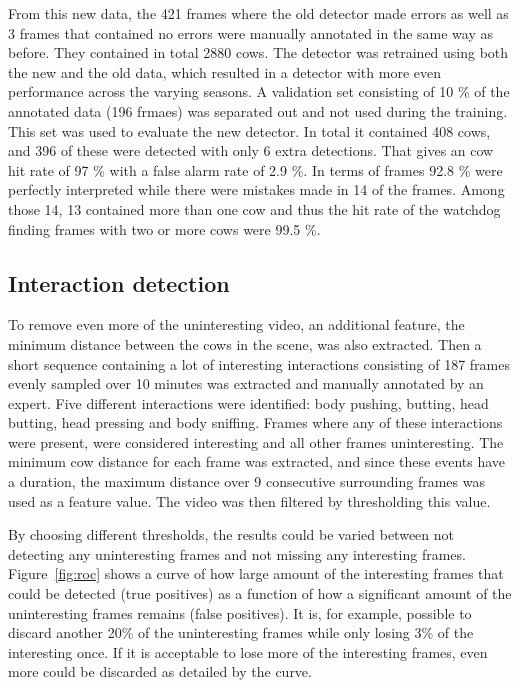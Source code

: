 \documentclass{IET}
\begin{document}
From this new data, the 421 frames where the old detector made errors as well as 3 frames that contained no errors were manually annotated in the same way as before. They contained in total 2880 cows. The detector was retrained using both the new and the old data, which resulted in a detector with more even performance across the varying seasons. A validation set consisting of 10 \% of the annotated data (196 frmaes) was separated out and not used during the training. This set was used to evaluate the new detector. In total it contained 408 cows, and 396 of these were detected with only 6 extra detections. That gives an cow hit rate of 97 \% with a false alarm rate of 2.9 \%. In terms of frames 92.8 \% were perfectly interpreted while there were mistakes made in 14 of the frames. Among those 14, 13 contained more than one cow and thus the hit rate of the watchdog finding frames with two or more cows were 99.5 \%.

\subsection{Interaction detection}
To remove even more of the uninteresting video, an additional feature, the minimum distance between the cows in the scene, was also extracted. Then a short sequence containing a lot of interesting interactions consisting of 187 frames evenly sampled over 10 minutes was extracted and manually annotated by an expert. Five different interactions were identified: body pushing, butting, head butting, head pressing and body sniffing. Frames where any of these interactions were present, were considered interesting and all other frames uninteresting. The minimum cow distance for each frame was extracted, and since these events have a duration, the maximum distance over 9 consecutive surrounding frames was used as a feature value. The video was then filtered by thresholding this value. 

By choosing different thresholds, the results could be varied between not detecting any uninteresting frames and not missing any interesting frames. Figure~\ref{fig:roc} shows a curve of how large amount of the interesting frames that could be detected (true positives) as a function of how a significant amount of the uninteresting frames remains (false positives). It is, for example, possible to discard another 20\% of the uninteresting frames while only losing 3\% of the interesting once. If it is acceptable to lose more of the interesting frames, even more could be discarded as detailed by the curve.
\end{document}
